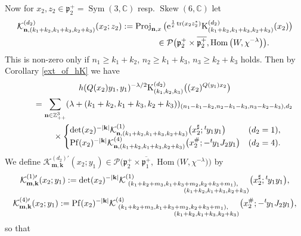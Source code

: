 \documentclass[pdftex]{sigma}
\numberwithin{equation}{section}
\newcommand{\bk}{\mathbf{k}}
\newcommand{\bm}{\mathbf{m}}
\newcommand{\bn}{\mathbf{n}}
\newcommand{\BZ}{\mathbb{Z}}
\newcommand{\BC}{\mathbb{C}}
\newcommand{\fp}{\mathfrak{p}}
\newcommand{\cK}{\mathcal{K}}
\newcommand{\cP}{\mathcal{P}}
\newcommand{\rK}{\mathrm{K}}
\newcommand{\Hom}{\operatorname{Hom}}
\newcommand{\tr}{\operatorname{tr}}
\newcommand{\Pf}{\operatorname{Pf}}
\newcommand{\Proj}{\operatorname{Proj}}
\newcommand{\Sym}{\operatorname{Sym}}
\newcommand{\Skew}{\operatorname{Skew}}
\begin{document}
Now for $x_2,z_2\in\fp^+_2=\Sym(3,\BC)$ resp. $\Skew(6,\BC)$ let
\begin{gather*}
\cK_{\bn,(k_1+k_2,k_1+k_3,k_2+k_3)}^{(d_2)}(x_2;z_2)
:=\Proj_{\bn,x}\big({\rm e}^{\frac{1}{\varepsilon}\tr(x_2z_2^*)}\rK_{(k_1+k_2,k_1+k_3,k_2+k_3)}^{(d_2)}(x_2)\big) \\
\hphantom{\cK_{\bn,(k_1+k_2,k_1+k_3,k_2+k_3)}^{(d_2)}(x_2;z_2):=}{} \in\cP\big(\fp^+_2\times\overline{\fp^+_2},\Hom\big(W,\chi^{-\lambda}\big)\big).
\end{gather*}
This is non-zero only if $n_1\ge k_1+k_2$, $n_2\ge k_1+k_3$, $n_3\ge k_2+k_3$ holds.
Then by Corollary \ref{ext_of_hK} we have
\begin{gather*}
 h(Q(x_2)y_1,y_1)^{-\lambda/2}\rK_{(k_1,k_2,k_3)}^{(d_2)}\big((x_2)^{Q(y_1)x_2}\big) \\
\qquad{}=\sum_{\bn\in\BZ_{++}^3}(\lambda+(k_1+k_2,k_1+k_3,k_2+k_3))_{(n_1-k_1-k_2,n_2-k_1-k_3,n_3-k_2-k_3),d_2} \\
\qquad\quad{} \times \begin{cases} \det(x_2)^{-|\bk|}\cK_{\bn,(k_1+k_2,k_1+k_3,k_2+k_3)}^{(1)}\big(x_2^\sharp;{}^t\hspace{-1pt}y_1y_1\big) & (d_2=1), \\
\Pf(x_2)^{-|\bk|}\cK_{\bn,(k_1+k_2,k_1+k_3,k_2+k_3)}^{(4)}\big(x_2^\#;-{}^t\hspace{-1pt}y_1J_2y_1\big) & (d_2=4). \end{cases}
\end{gather*}
We define $\cK_{\bm,\bk}^{(d_2)\prime}(x_2;y_1)\in\cP\big(\fp^+_2\times\overline{\fp^+_1},\Hom\big(W,\chi^{-\lambda}\big)\big)$ by
\begin{gather*}
\cK_{\bm,\bk}^{(1)\prime}(x_2;y_1) :=\det(x_2)^{-|\bk|}
\cK_{\substack{(k_1+k_2+m_3,k_1+k_3+m_2,k_2+k_3+m_1),\quad \\ \hspace{70pt}(k_1+k_2,k_1+k_3,k_2+k_3)}}^{(1)}
\big(x_2^\sharp;{}^t\hspace{-1pt}y_1y_1\big), \\
\cK_{\bm,\bk}^{(4)\prime}(x_2;y_1) :=\Pf(x_2)^{-|\bk|}
\cK_{\substack{(k_1+k_2+m_3,k_1+k_3+m_2,k_2+k_3+m_1),\quad \\ \hspace{70pt}(k_1+k_2,k_1+k_3,k_2+k_3)}}^{(4)}
\big(x_2^\#;-{}^t\hspace{-1pt}y_1J_2y_1\big),
\end{gather*}
so that
\end{document}

